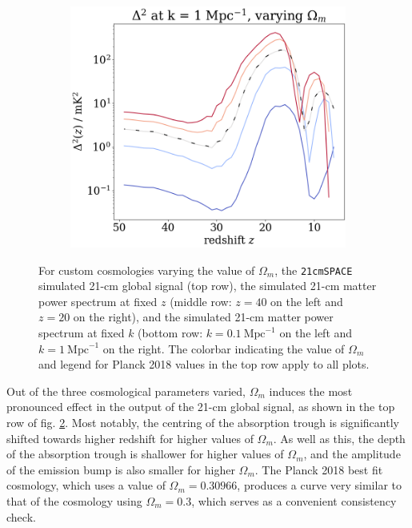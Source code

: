 \documentclass[floats,floatfix,showpacs,amssymb,prd,superscriptaddress,nofootinbib]{revtex4-2} %
\newcommand{\code}{\texttt}
\begin{document}
\begin{figure}[H]
\begin{subfigure}[b]{0.45\textwidth}
     \end{subfigure}
     \hfill
     \begin{subfigure}[b]{0.45\textwidth}
         \centering
         \includegraphics[width=\textwidth]{images/simulation_results/power_spectrum_fixed_k_1_Om.png}
         \label{fig:power_spectrum_fixed_k_1_Om}
     \end{subfigure}
        \caption{For custom cosmologies varying the value of $\Omega_m$, the \code{21cmSPACE} simulated 21-cm global signal (top row), the simulated 21-cm matter power spectrum at fixed $z$ (middle row: $z = 40$ on the left and $z = 20$ on the right), and the simulated 21-cm matter power spectrum at fixed $k$ (bottom row: $k = 0.1 ~\text{Mpc}^{-1}$ on the left and $k = 1 ~\text{Mpc}^{-1}$ on the right. The colorbar indicating the value of $\Omega_m$ and legend for Planck 2018 values in the top row apply to all plots.}
        \label{fig:simulation_results_Om}
\end{figure}


Out of the three cosmological parameters varied, $\Omega_m$ induces the most pronounced effect in the output of the 21-cm global signal, as shown in the top row of fig. \ref{fig:simulation_results_Om}. Most notably, the centring of the absorption trough is significantly shifted towards higher redshift for higher values of $\Omega_m$. As well as this, the depth of the absorption trough is shallower for higher values of $\Omega_m$, and the amplitude of the emission bump is also smaller for higher $\Omega_m$. The Planck 2018 best fit cosmology, which uses a value of $\Omega_m = 0.30966$, produces a curve very similar to that of the cosmology using $\Omega_m = 0.3$, which serves as a convenient consistency check. 
\end{document}
